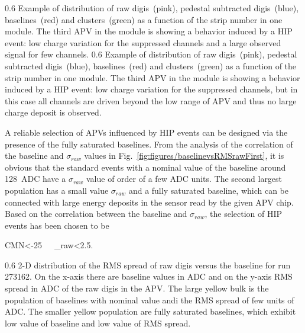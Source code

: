                  {0.6}       %
                 {Example of distribution of raw digis~(pink), pedestal subtracted digis~(blue), baselines~(red) and clusters~(green) as a function of the strip number in one module. The third APV in the module is showing a behavior induced by a HIP event: low charge variation for the suppressed channels and a large observed signal for few channels. } %
                 {0.6}       %
                 {Example of distribution of raw digis~(pink), pedestal subtracted digis~(blue), baselines~(red) and clusters~(green) as a function of the strip number in one module. The third APV in the module is showing a behavior induced by a HIP event: low charge variation for the suppressed channels, but in this case all channels are driven beyond the low range of APV and thus no large charge deposit is observed. } %

A reliable selection of APVs influenced by HIP events can be designed via the presence of the fully saturated baselines. From the analysis of the correlation of the baseline and $\sigma_{raw}$ values in Fig.~\ref{fig:figures/baselinevsRMSrawFirst}, it is obvious that the standard events with a nominal value of the baseline around 128~ADC have a $\sigma_{raw}$ value of order of a few ADC units. The second largest population has a small value $\sigma_{raw}$ and a fully saturated baseline, which can be connected with large energy deposits in the sensor read by the given APV chip. Based on the correlation between the baseline and $\sigma_{raw}$, the selection of HIP events has been chosen to be 

{
CMN<-25~~~\sigma_{raw}<2.5.
}

                 {0.6}       %
                 {2-D distribution of the RMS spread of raw digis versus the baseline for run 273162. On the x-axis there are baseline values in ADC and on the y-axis RMS spread in ADC of the raw digis in the APV. The large yellow bulk is the population of baselines with nominal value andi the RMS spread of few units of ADC. The smaller yellow population are fully saturated baselines, which exhibit low value of baseline and low value of RMS spread. } %

